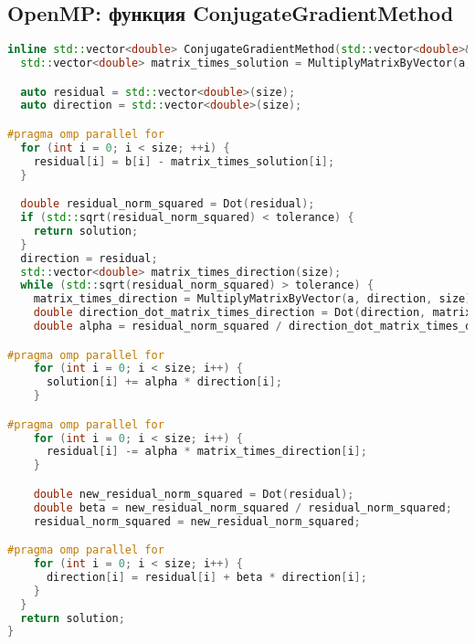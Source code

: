 \documentclass[12pt]{article}
\begin{document}
\subsection*{OpenMP: функция ConjugateGradientMethod}
\begin{lstlisting}[language=C++]
inline std::vector<double> ConjugateGradientMethod(std::vector<double>& a, std::vector<double>& b, std::vector<double> solution, double tolerance, int size) {
  std::vector<double> matrix_times_solution = MultiplyMatrixByVector(a, solution, size);

  auto residual = std::vector<double>(size);
  auto direction = std::vector<double>(size);

#pragma omp parallel for
  for (int i = 0; i < size; ++i) {
    residual[i] = b[i] - matrix_times_solution[i];
  }

  double residual_norm_squared = Dot(residual);
  if (std::sqrt(residual_norm_squared) < tolerance) {
    return solution;
  }
  direction = residual;
  std::vector<double> matrix_times_direction(size);
  while (std::sqrt(residual_norm_squared) > tolerance) {
    matrix_times_direction = MultiplyMatrixByVector(a, direction, size);
    double direction_dot_matrix_times_direction = Dot(direction, matrix_times_direction);
    double alpha = residual_norm_squared / direction_dot_matrix_times_direction;

#pragma omp parallel for
    for (int i = 0; i < size; i++) {
      solution[i] += alpha * direction[i];
    }

#pragma omp parallel for
    for (int i = 0; i < size; i++) {
      residual[i] -= alpha * matrix_times_direction[i];
    }

    double new_residual_norm_squared = Dot(residual);
    double beta = new_residual_norm_squared / residual_norm_squared;
    residual_norm_squared = new_residual_norm_squared;

#pragma omp parallel for
    for (int i = 0; i < size; i++) {
      direction[i] = residual[i] + beta * direction[i];
    }
  }
  return solution;
}
\end{lstlisting}
\end{document}
